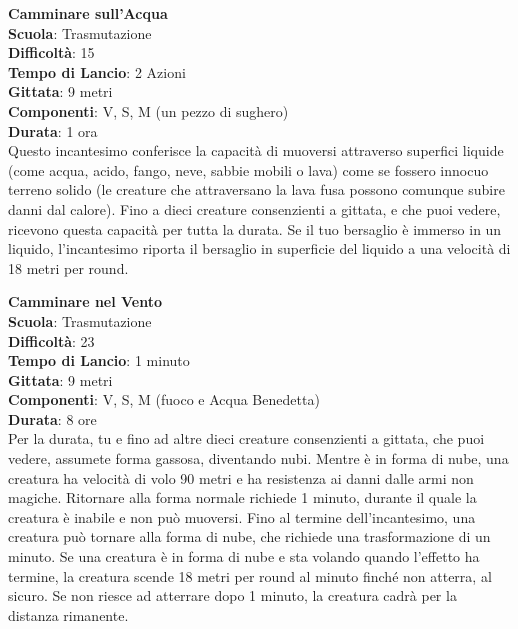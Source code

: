 \begin{multicols}{2}
\medskip\textbf{Camminare sull'Acqua}\\
\textbf{Scuola}: Trasmutazione\\
\textbf{Difficoltà}:  15\\
\textbf{Tempo di Lancio}: 2 Azioni\\
\textbf{Gittata}: 9 metri\\
\textbf{Componenti}: V, S, M (un pezzo di sughero)\\
\textbf{Durata}: 1 ora\\
Questo incantesimo conferisce la capacità di muoversi attraverso superfici liquide (come acqua, acido, fango, neve, sabbie mobili o lava) come se fossero innocuo terreno solido (le creature che attraversano la lava fusa possono comunque subire danni dal calore). Fino a dieci creature consenzienti a gittata, e che puoi vedere, ricevono questa capacità per tutta la durata. Se il tuo bersaglio è immerso in un liquido, l'incantesimo riporta il bersaglio in superficie del liquido a una velocità di 18 metri per round. 

\medskip\textbf{Camminare nel Vento}\\
\textbf{Scuola}: Trasmutazione\\
\textbf{Difficoltà}:  23\\
\textbf{Tempo di Lancio}: 1 minuto\\
\textbf{Gittata}: 9 metri\\
\textbf{Componenti}: V, S, M (fuoco e Acqua Benedetta)\\
\textbf{Durata}: 8 ore\\
Per la durata, tu e fino ad altre dieci creature consenzienti a gittata, che puoi vedere, assumete forma gassosa, diventando nubi. Mentre è in forma di nube, una creatura ha velocità di volo 90 metri e ha resistenza ai danni dalle armi non magiche. Ritornare alla forma normale richiede 1 minuto, durante il quale la creatura è inabile e non può muoversi. Fino al termine dell'incantesimo, una creatura può tornare alla forma di nube, che richiede una trasformazione di un minuto. Se una creatura è in forma di nube e sta volando quando l’effetto ha termine, la creatura scende 18 metri per round al minuto finché non atterra, al sicuro. Se non riesce ad atterrare dopo 1 minuto, la creatura cadrà per la distanza rimanente.


\end{multicols}
